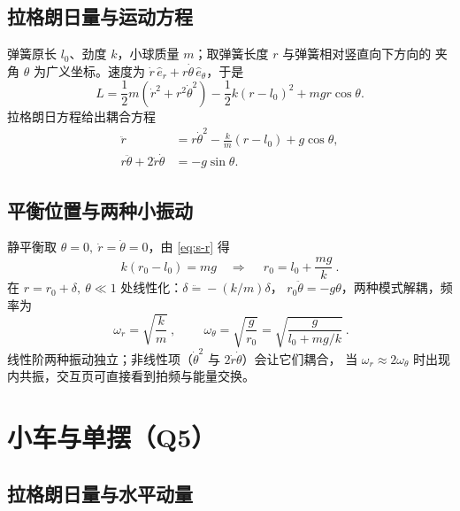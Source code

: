 \documentclass[UTF8,a4paper,11pt]{ctexart}
\begin{document}
\subsection{拉格朗日量与运动方程}

弹簧原长 $l_0$、劲度 $k$，小球质量 $m$；取弹簧长度 $r$ 与弹簧相对竖直向下方向的
夹角 $\theta$ 为广义坐标。速度为 $\dot r\,\hat e_r+r\dot\theta\,\hat e_\theta$，于是
\begin{equation}
  L=\frac12m\left(\dot r^2+r^2\dot\theta^2\right)-\frac12k(r-l_0)^2+mgr\cos\theta .
  \label{eq:s-L}
\end{equation}
拉格朗日方程给出耦合方程
\begin{align}
  \ddot r&=r\dot\theta^2-\frac{k}{m}(r-l_0)+g\cos\theta, \label{eq:s-r}\\
  r\ddot\theta+2\dot r\dot\theta&=-g\sin\theta. \label{eq:s-th}
\end{align}

\subsection{平衡位置与两种小振动}

静平衡取 $\theta=0,\ \dot r=\dot\theta=0$，由 \eqref{eq:s-r} 得
\begin{equation}
  k(r_0-l_0)=mg
  \quad\Longrightarrow\quad
  \boxed{\ r_0=l_0+\frac{mg}{k}\ }.
  \label{eq:s-r0}
\end{equation}
在 $r=r_0+\delta,\ \theta\ll1$ 处线性化：$\delta\ddot=-(k/m)\delta$，
$r_0\ddot\theta=-g\theta$，两种模式解耦，频率为
\begin{equation}
  \boxed{\ \omega_r=\sqrt{\frac{k}{m}}\ },\qquad
  \boxed{\ \omega_\theta=\sqrt{\frac{g}{r_0}}=\sqrt{\frac{g}{l_0+mg/k}}\ }.
  \label{eq:s-freq}
\end{equation}
线性阶两种振动独立；非线性项（$\dot\theta^2$ 与 $2\dot r\dot\theta$）会让它们耦合，
当 $\omega_r\approx2\omega_\theta$ 时出现内共振，交互页可直接看到拍频与能量交换。

\section{小车与单摆（Q5）}\label{sec:cart}

\subsection{拉格朗日量与水平动量}
\end{document}
